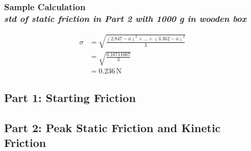 \subsubsection{Sample Calculation \\ {\normalfont \small\textit{std of static friction in Part 2 with 1000 g in wooden box }}}

\begin{align*}
	\sigma &= \sqrt{\frac{(2.847-\overline{a})^2 + ... + (3.362-\overline{a})^2}{3}} \\
		 &= \sqrt{\frac{0.16711667}{3}} \\
		 &= \boxed{0.236\, \text{N}}
\end{align*}




\subsection{Part 1: Starting Friction}

\begin{table}[H]
\centering
{}
\caption{Part 1: Starting Friction}
\label{tab:massBox}
\end{table}

\subsection{Part 2: Peak Static Friction and Kinetic Friction}


